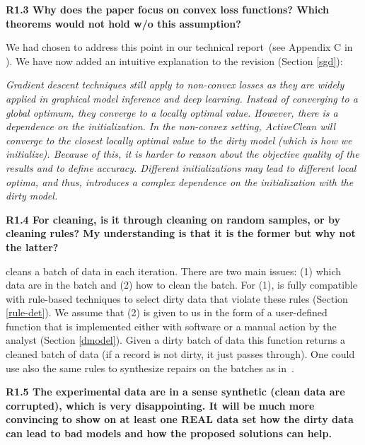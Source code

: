 \vspace{0.5em}

\noindent\textbf{R1.3 Why does the paper focus on convex loss functions? Which theorems would not hold w/o this assumption?}

\noindent We had chosen to address this point in our technical report~(see Appendix C in \cite{activecleanarxiv}). We have now added an intuitive explanation to the revision (Section \ref{sgd}):

\emph{Gradient descent techniques still apply to non-convex losses as they are widely applied in graphical model inference and deep learning. Instead of converging to a global optimum,
they converge to a locally optimal value. However, there is a dependence on the initialization.
In the non-convex setting, ActiveClean will converge to the closest locally optimal value to
the dirty model (which is how we initialize). Because of this, it is harder to reason about
the objective quality of the results and to define accuracy.
 Different initializations may lead to different local
optima, and thus, introduces a complex dependence on the
initialization with the dirty model.}

\vspace{0.5em}

\noindent\textbf{R1.4 For cleaning, is it through cleaning on random samples, or by cleaning rules? My understanding is that it is the former but why not the latter?}

\noindent \sys cleans a batch of data in each iteration. 
There are two main issues: (1) which data are in the batch and (2) how to clean the batch. 
For (1), \sys is fully compatible with rule-based techniques to select dirty data that violate these rules (Section \ref{rule-det}).
We assume that (2) is given to us in the form of a user-defined function that is implemented either with software or a manual action by the analyst (Section \ref{dmodel}). 
Given a dirty batch of data this function returns a cleaned batch of data (if a record is not dirty, it just passes through).
One could use also the same rules to synthesize repairs on the batches as in~\cite{DBLP:journals/pvldb/YakoutENOI11}.

\vspace{0.5em}

\noindent\textbf{R1.5 The experimental data are in a sense synthetic (clean data are corrupted), which is very disappointing. It will be much more convincing to show on at least one REAL data set how the dirty data can lead to bad models and how the proposed solutions can help.}

